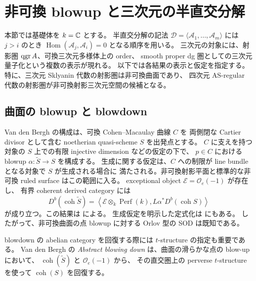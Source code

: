 \section{非可換 blowup と三次元の半直交分解}
\label{blowup:section}\label{sec:nc-blowups}

本節では基礎体を $k=\mathbb C$ とする。
半直交分解の記法
$\mathcal D=\langle\mathcal A_1,\ldots,\mathcal A_m\rangle$
には $j>i$ のとき
$\operatorname{Hom}(\mathcal A_j,\mathcal A_i)=0$ となる順序を用いる。
三次元の対象には、射影圏 $\operatorname{qgr} A$、可換三次元多様体上の order、
smooth proper dg 圏としての三次元量子化という複数の表示が現れる。
以下では各結果の表示と仮定を指定する。
特に、三次元 Sklyanin 代数の射影圏は非可換曲面であり、
四次元 AS-regular 代数の射影圏が非可換射影三次元空間の候補となる。

\subsection{曲面の blowup と blowdown}
\label{blowup:surfaces}

Van den Bergh の構成は、可換 Cohen--Macaulay 曲線 $C$ を
両側閉な Cartier divisor として含む noetherian quasi-scheme $S$ を出発点とする。
$C$ に支えを持つ対象の $S$ 上での有限 injective dimension などの仮定の下で、
$p\in C$ における blowup $\alpha\colon\widetilde S\to S$ を構成する。
生成に関する仮定は、$C$ への制限が line bundle となる対象で $S$ が生成される場合に
満たされる。非可換射影平面と標準的な非可換 ruled surface はこの範囲に入る。
exceptional object $\mathcal E=\mathcal O_e(-1)$ が存在し、
有界 coherent derived category には
\begin{equation}\label{blowup:surface-sod}
 D^b(\operatorname{coh}\widetilde S)
 =\left\langle
     \mathcal E\otimes_k\operatorname{Perf}(k),
     L\alpha^*D^b(\operatorname{coh}S)
   \right\rangle
\end{equation}
が成り立つ。この結果は \cite[定理8.4.1]{BlowupVdB2001} による。
生成仮定を明示した定式化は \cite[定理11.12]{BlowupRains2025} にもある。
したがって、非可換曲面の点 blowup に対する Orlov 型の SOD は既知である。

blowdown の abelian category を回復する際には $t$-structure の指定も重要である。
Van den Bergh の \emph{Abstract blowing down} は、曲面の滑らかな点の blow-up において、
$\operatorname{coh}(\widetilde S)$ と $\mathcal O_e(-1)$ から、
その直交圏上の perverse $t$-structure を使って $\operatorname{coh}(S)$ を回復する。
\cite[定理1.1]{BlowupAbstract}

